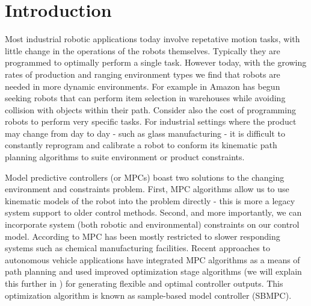 \documentclass[main.tex]{subfile}
\begin{document}
\section{Introduction} 
\label{sec:introduction}

Most industrial robotic applications today involve repetative motion tasks, with
little change in the operations of the robots themselves. Typically they are
programmed to optimally perform a single task. However today, with the growing
rates of production and ranging environment types we find that robots are needed
in more dynamic environments. For example in \cite{amazon} Amazon has begun
seeking robots that can perform item selection in warehouses while avoiding
collision with objects within their path.  Consider also the cost of programming
robots to perform very specific tasks. For industrial settings where the product
may change from day to day - such as glass manufacturing - it is difficult to
constantly reprogram and calibrate a robot to conform its kinematic path
planning algorithms to suite environment or product constraints. 

Model predictive controllers (or MPCs) boast two solutions to the changing
environment and constraints problem. First, MPC algorithms allow us to use
kinematic models of the robot into the problem directly - this is more a legacy
system support to older control methods. Second, and more importantly, we can
incorporate system (both robotic and environmental) constraints on our control
model. According to \cite{autoVehicle} MPC has been mostly restricted to slower
responding systems such as chemical manufacturing facilities. Recent approaches
to autonomous vehicle applications have integrated MPC algorithms as a means of
path planning \cite{auv,uphill} and used improved optimization stage algorithms
(we will explain this further in ) for generating flexible and
optimal controller outputs. This optimization algorithm is known as sample-based
model controller (SBMPC).

\end{document}
